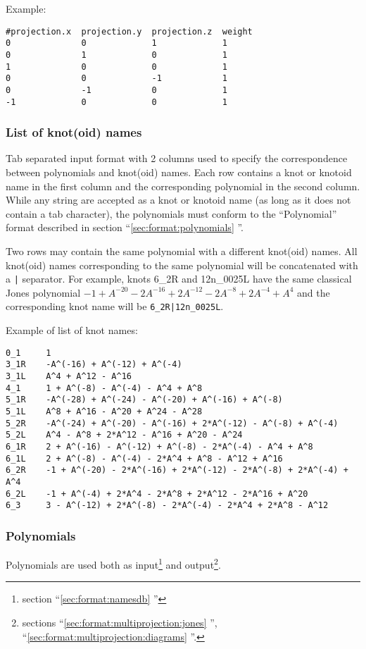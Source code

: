 Example:
\begin{lstlisting}
#projection.x  projection.y  projection.z  weight
0              0             1             1
0              1             0             1
1              0             0             1
0              0             -1            1
0              -1            0             1
-1             0             0             1
\end{lstlisting}



\subsubsection{\label{sec:format:namesdb}List of knot(oid) names}
Tab separated input format with 2 columns used to specify the correspondence between polynomials and knot(oid) names. Each row contains a knot or knotoid name in the first column and the corresponding polynomial in the second column.
While any string are accepted as a knot or knotoid name (as long as it does not contain a tab character), the polynomials must conform to the ``Polynomial'' format described in  section ``\ref{sec:format:polynomials} ''.

Two rows may contain the same polynomial with a different knot(oid) names. All knot(oid) names corresponding to the same polynomial will be concatenated  with a \lstinline{|} separator. For example, knots 6\_2R and 12n\_0025L have the same classical Jones polynomial $-1 + A^{-20} - 2 A^{-16} + 2 A^{-12} - 2 A^{-8} + 2 A^{-4} + A^4$ and the  corresponding knot name will be \lstinline{6_2R|12n_0025L}.


Example of list of knot names:
\begin{lstlisting}
0_1     1
3_1R    -A^(-16) + A^(-12) + A^(-4)
3_1L    A^4 + A^12 - A^16
4_1     1 + A^(-8) - A^(-4) - A^4 + A^8
5_1R    -A^(-28) + A^(-24) - A^(-20) + A^(-16) + A^(-8)
5_1L    A^8 + A^16 - A^20 + A^24 - A^28
5_2R    -A^(-24) + A^(-20) - A^(-16) + 2*A^(-12) - A^(-8) + A^(-4)
5_2L    A^4 - A^8 + 2*A^12 - A^16 + A^20 - A^24
6_1R    2 + A^(-16) - A^(-12) + A^(-8) - 2*A^(-4) - A^4 + A^8
6_1L    2 + A^(-8) - A^(-4) - 2*A^4 + A^8 - A^12 + A^16
6_2R    -1 + A^(-20) - 2*A^(-16) + 2*A^(-12) - 2*A^(-8) + 2*A^(-4) + A^4
6_2L    -1 + A^(-4) + 2*A^4 - 2*A^8 + 2*A^12 - 2*A^16 + A^20
6_3     3 - A^(-12) + 2*A^(-8) - 2*A^(-4) - 2*A^4 + 2*A^8 - A^12
\end{lstlisting}



\subsubsection{\label{sec:format:polynomials}Polynomials}
Polynomials are used both as input\footnote{section ``\ref{sec:format:namesdb} ''} and output\footnote{sections ``\ref{sec:format:multiprojection:jones} '', ``\ref{sec:format:multiprojection:diagrams} ''.}.

